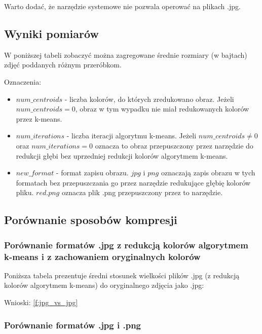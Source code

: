 Warto dodać, że narzędzie systemowe nie pozwala operować na plikach .jpg.

\subsection{Wyniki pomiarów}

W poniższej tabeli zobaczyć można zagregowane średnie rozmiary (w bajtach) zdjęć poddanych różnym przeróbkom.

Oznaczenia:
\begin{itemize}
	\item $num\_centroids$ - liczba kolorów, do których zredukowano obraz. Jeżeli $num\_centroids = 0$, obraz w tym wypadku nie miał redukowanych kolorów przez k-means.
    \item $num\_iterations$ - liczba iteracji algorytmu k-means. Jeżeli $num\_centroids \neq 0$ oraz $num\_iterations = 0$ oznacza to obraz przepuszczony przez narzędzie do redukcji głębi bez uprzedniej redukcji kolorów algorytmem k-means.
    \item $new\_format$ - format zapisu obrazu. $jpg$ i $png$ oznaczają zapis obrazu w tych formatach bez przepuszczania go przez narzędzie redukujące głębię kolorów pliku. $red.png$ oznacza plik .png przepuszczony przez to narzędzie.
\end{itemize}

\begin{figure}[H]
	
\end{figure}

\subsection{Porównanie sposobów kompresji}

\subsubsection{Porównanie formatów .jpg z redukcją kolorów algorytmem k-means i z zachowaniem oryginalnych kolorów}
\label{m:jpg_vs_jpg}
Poniższa tabela prezentuje średni stosunek wielkości plików .jpg (z redukcją kolorów algorytmem k-means) do oryginalnego zdjęcia jako .jpg:
\begin{figure}[H]
	
\end{figure}

Wnioski: \ref{f:jpg_vs_jpg}

\subsubsection{Porównanie formatów .jpg i .png}
\label{m:png_vs_jpg}

